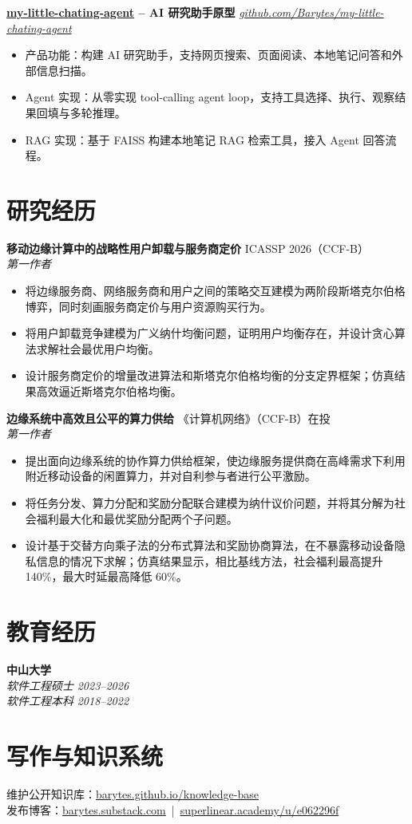 \documentclass[10pt,letterpaper,fontset=fandol]{ctexart}
\newcommand{\resumeItem}[1]{\item #1}
\newcommand{\resumeSubheading}[4]{
  \textbf{#1} \hfill #2 \\
  \textit{#3} \hfill \textit{#4}
}
\newcommand{\projectHeading}[2]{
  \textbf{#1} \hfill \textit{#2}
}
\begin{document}
\projectHeading{\href{https://github.com/Barytes/my-little-chating-agent}{my-little-chating-agent} -- AI 研究助手原型}{\href{https://github.com/Barytes/my-little-chating-agent}{github.com/Barytes/my-little-chating-agent}}
\begin{itemize}
  \resumeItem{产品功能：构建 AI 研究助手，支持网页搜索、页面阅读、本地笔记问答和外部信息扫描。}
  \resumeItem{Agent 实现：从零实现 tool-calling agent loop，支持工具选择、执行、观察结果回填与多轮推理。}
  \resumeItem{RAG 实现：基于 FAISS 构建本地笔记 RAG 检索工具，接入 Agent 回答流程。}
\end{itemize}

\section{研究经历}

\resumeSubheading{移动边缘计算中的战略性用户卸载与服务商定价}{ICASSP 2026（CCF-B）}
{第一作者}{}
\begin{itemize}
  \resumeItem{将边缘服务商、网络服务商和用户之间的策略交互建模为两阶段斯塔克尔伯格博弈，同时刻画服务商定价与用户资源购买行为。}
  \resumeItem{将用户卸载竞争建模为广义纳什均衡问题，证明用户均衡存在，并设计贪心算法求解社会最优用户均衡。}
  \resumeItem{设计服务商定价的增量改进算法和斯塔克尔伯格均衡的分支定界框架；仿真结果高效逼近斯塔克尔伯格均衡。}
\end{itemize}

\resumeSubheading{边缘系统中高效且公平的算力供给}{《计算机网络》（CCF-B）在投}
{第一作者}{}
\begin{itemize}
  \resumeItem{提出面向边缘系统的协作算力供给框架，使边缘服务提供商在高峰需求下利用附近移动设备的闲置算力，并对自利参与者进行公平激励。}
  \resumeItem{将任务分发、算力分配和奖励分配联合建模为纳什议价问题，并将其分解为社会福利最大化和最优奖励分配两个子问题。}
  \resumeItem{设计基于交替方向乘子法的分布式算法和奖励协商算法，在不暴露移动设备隐私信息的情况下求解；仿真结果显示，相比基线方法，社会福利最高提升 140\%，最大时延最高降低 60\%。}
\end{itemize}

\section{教育经历}

\textbf{中山大学}  \\
\textit{软件工程硕士} \hfill \textit{2023--2026} \\
\textit{软件工程本科} \hfill \textit{2018--2022}

\section{写作与知识系统}
维护公开知识库：\href{https://barytes.github.io/knowledge-base}{barytes.github.io/knowledge-base} \\
发布博客：\href{https://barytes.substack.com}{barytes.substack.com} \,|\,
\href{https://www.superlinear.academy/u/e062296f}{superlinear.academy/u/e062296f}
\end{document}

